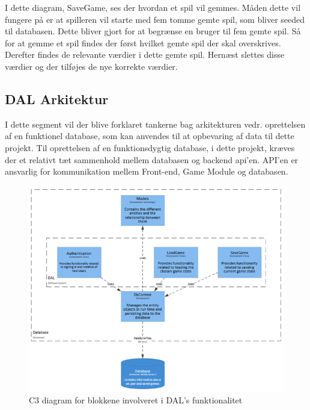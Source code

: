 I dette diagram, SaveGame, ses der hvordan et spil vil gemmes. Måden dette vil fungere på er at spilleren vil starte med fem tomme gemte spil, som bliver seeded til databasen. Dette bliver gjort for at begrænse en bruger til fem gemte spil. Så for at gemme et spil findes der først hvilket gemte spil der skal overskrives. Derefter findes de relevante værdier i dette gemte spil. Hernæst slettes disse værdier og der tilføjes de nye korrekte værdier.



\subsection{DAL Arkitektur}
I dette segment vil der blive forklaret tankerne bag arkitekturen vedr. oprettelsen af en funktionel database, som kan anvendes til at opbevaring af data til dette projekt.
Til oprettelsen af en funktionsdygtig database, i dette projekt, kræves der et relativt tæt sammenhold mellem databasen og backend api’en. API’en er ansvarlig for kommunikation mellem Front-end, Game Module og databasen.

\begin{figure}[H]
\centering
\includegraphics[width = \textwidth]{02-Body/Images/DALArkitektur}
\caption{C3 diagram for blokkene involveret i DAL's funktionalitet}
\label{fig:DALArkitektur}
\end{figure}


